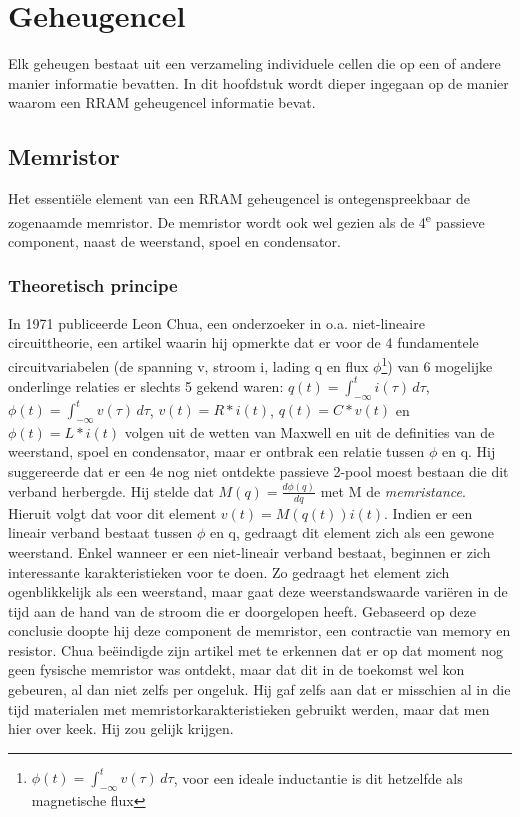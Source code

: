 \chapter{Geheugencel}
\label{cell}
Elk geheugen bestaat uit een verzameling individuele cellen die op een of andere manier informatie bevatten.
In dit hoofdstuk wordt dieper ingegaan op de manier waarom een RRAM geheugencel informatie bevat.

\section{Memristor}
Het essentiële element van een RRAM geheugencel is ontegenspreekbaar de zogenaamde memristor.
De memristor wordt ook wel gezien als de 4\textsuperscript{e} passieve component, naast de weerstand, spoel en condensator.

\subsection{Theoretisch principe}
In 1971 publiceerde Leon Chua, een onderzoeker in o.a. niet-lineaire circuittheorie, een artikel waarin hij opmerkte dat er voor de 4 fundamentele circuitvariabelen (de spanning v, stroom i, lading q en flux $\phi$\footnote{$\phi(t) =  \int^{t}_{-\infty} v(\tau) \, d\tau $, voor een ideale inductantie is dit hetzelfde als magnetische flux}) van 6 mogelijke onderlinge relaties er slechts 5 gekend waren: $q(t) =  \int^{t}_{-\infty} i(\tau) \, d\tau $, $\phi(t) =  \int^{t}_{-\infty} v(\tau) \, d\tau $, $v(t)=R*i(t)$, $q(t)=C*v(t)$ en $\phi(t) = L*i(t)$ volgen uit de wetten van Maxwell en uit de definities van de weerstand, spoel en condensator, maar er ontbrak een relatie tussen $\phi$ en q\cite{Chu71}. Hij suggereerde dat er een 4e nog niet ontdekte passieve 2-pool moest bestaan die dit verband herbergde. Hij stelde dat $M(q)= \frac{d\phi(q)}{dq}$ met M de \emph{memristance}.
Hieruit volgt dat voor dit element $v(t)=M(q(t)) i(t)$. Indien er een lineair verband bestaat tussen $\phi$ en q, gedraagt dit element zich als een gewone weerstand. Enkel wanneer er een niet-lineair verband bestaat, beginnen er zich interessante karakteristieken voor te doen. Zo gedraagt het element zich ogenblikkelijk als een weerstand, maar gaat deze weerstandswaarde variëren in de tijd aan de hand van de stroom die er doorgelopen heeft.
Gebaseerd op deze conclusie doopte hij deze component de memristor, een contractie van memory en resistor.
Chua beëindigde zijn artikel met te erkennen dat er op dat moment nog geen fysische memristor was ontdekt, maar dat dit in de toekomst wel kon gebeuren, al dan niet zelfs per ongeluk. Hij gaf zelfs aan dat er misschien al in die tijd materialen met memristorkarakteristieken gebruikt werden, maar dat men hier over keek. Hij zou gelijk krijgen.

